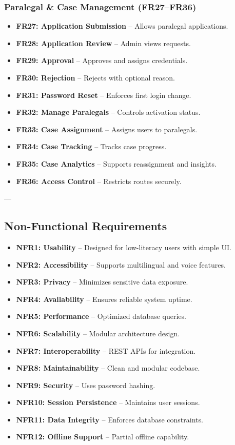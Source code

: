 \subsubsection{Paralegal \& Case Management (FR27--FR36)}
\begin{itemize}
    \item \textbf{FR27: Application Submission} -- Allows paralegal applications.
    \item \textbf{FR28: Application Review} -- Admin views requests.
    \item \textbf{FR29: Approval} -- Approves and assigns credentials.
    \item \textbf{FR30: Rejection} -- Rejects with optional reason.
    \item \textbf{FR31: Password Reset} -- Enforces first login change.
    \item \textbf{FR32: Manage Paralegals} -- Controls activation status.
    \item \textbf{FR33: Case Assignment} -- Assigns users to paralegals.
    \item \textbf{FR34: Case Tracking} -- Tracks case progress.
    \item \textbf{FR35: Case Analytics} -- Supports reassignment and insights.
    \item \textbf{FR36: Access Control} -- Restricts routes securely.
\end{itemize}

---

\subsection{Non-Functional Requirements}

\begin{itemize}
    \item \textbf{NFR1: Usability} -- Designed for low-literacy users with simple UI.
    \item \textbf{NFR2: Accessibility} -- Supports multilingual and voice features.
    \item \textbf{NFR3: Privacy} -- Minimizes sensitive data exposure.
    \item \textbf{NFR4: Availability} -- Ensures reliable system uptime.
    \item \textbf{NFR5: Performance} -- Optimized database queries.
    \item \textbf{NFR6: Scalability} -- Modular architecture design.
    \item \textbf{NFR7: Interoperability} -- REST APIs for integration.
    \item \textbf{NFR8: Maintainability} -- Clean and modular codebase.
    \item \textbf{NFR9: Security} -- Uses password hashing.
    \item \textbf{NFR10: Session Persistence} -- Maintains user sessions.
    \item \textbf{NFR11: Data Integrity} -- Enforces database constraints.
    \item \textbf{NFR12: Offline Support} -- Partial offline capability.
\end{itemize}

